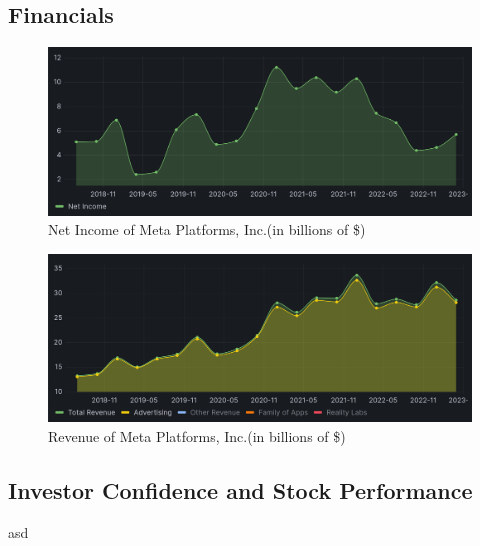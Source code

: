\documentclass[12pt, a4paper]{article}
\begin{document}
\subsection*{Financials}

\begin{figure}[H]
    \centering
    \includegraphics[width=1.00\textwidth]{net-income}
    \caption{Net Income of Meta Platforms, Inc.(in billions of
    \$)\cite{2023q1,2020q4,2020q3,2020q2,2020q1,2019q4,2019q3,2019q2,2019q1,2018q4,2018q3,2018q2}}
    \label{fig:net-income}
\end{figure}

\begin{figure}[H]
    \centering
    \includegraphics[width=1.00\textwidth]{revenue}
    \caption{Revenue of Meta Platforms, Inc.(in billions of
    \$)\cite{2023q1,2020q4,2020q3,2020q2,2020q1,2019q4,2019q3,2019q2,2019q1,2018q4,2018q3,2018q2}}
    \label{fig:revenue}
\end{figure}


\subsection*{Investor Confidence and Stock Performance}

asd

\end{document}
